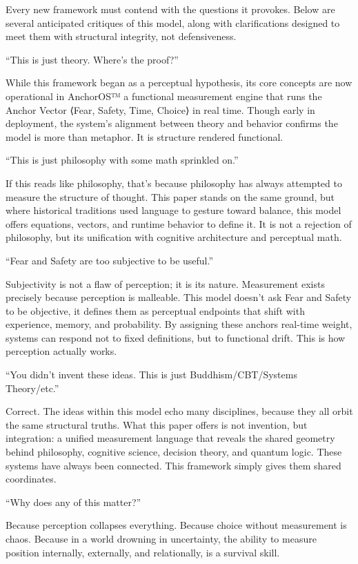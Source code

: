\documentclass[11pt]{article}
\begin{document}
Every new framework must contend with the questions it provokes. Below are several anticipated critiques of this model, along with clarifications designed to meet them with structural integrity, not defensiveness.

“This is just theory. Where’s the proof?”

While this framework began as a perceptual hypothesis, its core concepts are now operational in AnchorOS™ a functional measurement engine that runs the Anchor Vector ⟨Fear, Safety, Time, Choice⟩ in real time. Though early in deployment, the system’s alignment between theory and behavior confirms the model is more than metaphor. It is structure rendered functional.

“This is just philosophy with some math sprinkled on.”

If this reads like philosophy, that’s because philosophy has always attempted to measure the structure of thought. This paper stands on the same ground, but where historical traditions used language to gesture toward balance, this model offers equations, vectors, and runtime behavior to define it. It is not a rejection of philosophy, but its unification with cognitive architecture and perceptual math.

“Fear and Safety are too subjective to be useful.”

Subjectivity is not a flaw of perception; it is its nature. Measurement exists precisely because perception is malleable. This model doesn’t ask Fear and Safety to be objective, it defines them as perceptual endpoints that shift with experience, memory, and probability. By assigning these anchors real-time weight, systems can respond not to fixed definitions, but to functional drift. This is how perception actually works.

“You didn’t invent these ideas. This is just Buddhism/CBT/Systems Theory/etc.”

Correct. The ideas within this model echo many disciplines, because they all orbit the same structural truths. What this paper offers is not invention, but integration: a unified measurement language that reveals the shared geometry behind philosophy, cognitive science, decision theory, and quantum logic. These systems have always been connected. This framework simply gives them shared coordinates.

“Why does any of this matter?”

Because perception collapses everything.
Because choice without measurement is chaos.
Because in a world drowning in uncertainty, the ability to measure position internally, externally, and relationally, is a survival skill.
\end{document}

